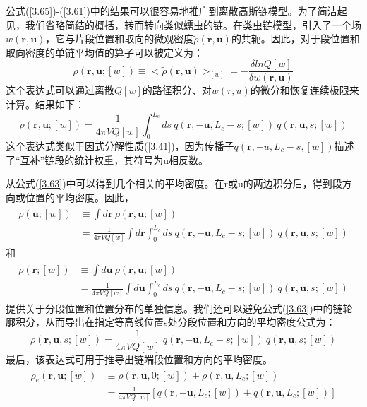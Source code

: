 公式(\ref{3.65})-(\ref{3.61})中的结果可以很容易地推广到离散高斯链模型。为了简洁起见，我们省略简结的概括，转而转向类似蠕虫的链。在类虫链模型，引入了一个场$w(\mathbf{r},\mathbf{u})$，它与片段位置和取向的微观密度$\tilde{\rho}(\mathbf{r},\mathbf{u})$的共轭。因此，对于段位置和取向密度的单链平均值的算子可以被定义为：
\begin{equation}\label{3.62}
\rho(\mathbf{r},\mathbf{u};[w])\equiv <\tilde{\rho}(\mathbf{r},\mathbf{u})>_{[w]}=-\frac{\delta lnQ[w]}{\delta w(\mathbf{r},\mathbf{u})}
\end{equation}
这个表达式可以通过离散$Q[w]$的路径积分、对$w(r,u)$的微分和恢复连续极限来计算。结果如下：
\begin{equation}\label{3.63}
\rho(\mathbf{r},\mathbf{u};[w])=\frac{1}{4\pi VQ[w]}\int_{0}^{L_c}ds~ q(\mathbf{r},-\mathbf{u},L_c-s;[w])~q(\mathbf{r},\mathbf{u},s;[w])
\end{equation}
这个表达式类似于因式分解性质(\ref{3.41})，因为传播子$q(\mathbf{r},-u,L_c-s,[w])$描述了“互补”链段的统计权重，其符号为u相反数。

从公式(\ref{3.63})中可以得到几个相关的平均密度。在r或u的两边积分后，得到段方向或位置的平均密度。因此，
\begin{align}\label{3.64}
\begin{split}
\rho(\mathbf{u};[w])&\equiv\int d\mathbf{r}~\rho(\mathbf{r},\mathbf{u};[w]) \\&=\frac{1}{4\pi VQ[w]}\int d\mathbf{r} \int_{0}^{L_c}ds~q(\mathbf{r},-\mathbf{u},L_c-s;[w])~q(\mathbf{r},\mathbf{u},s;[w])
\end{split}
\end{align}
和
\begin{align}\label{3.65}
\begin{split}
\rho(\mathbf{r};[w])&\equiv\int d\mathbf{u}~\rho(\mathbf{r},\mathbf{u};[w]) \\&=\frac{1}{4\pi VQ[w]}\int d\mathbf{u} \int_{0}^{L_c}ds~q(\mathbf{r},-\mathbf{u},L_c-s;[w])~q(\mathbf{r},\mathbf{u},s;[w])
\end{split}
\end{align}
提供关于分段位置和位置分布的单独信息。我们还可以避免公式(\ref{3.63})中的链轮廓积分，从而导出在指定等高线位置s处分段位置和方向的平均密度公式为：
\begin{equation}\label{3.66}
\rho(\mathbf{r},\mathbf{u},s;[w])=\frac{1}{4\pi VQ[w]}~q(\mathbf{r},-\mathbf{u},L_c-s;[w])~q(\mathbf{r},\mathbf{u},s;[w])
\end{equation}
最后，该表达式可用于推导出链端段位置和方向的平均密度。
\begin{align}\label{3.67}
\begin{split}
\rho_e(\mathbf{r},\mathbf{u};[w])&\equiv\rho(\mathbf{r},\mathbf{u},0;[w])+\rho(\mathbf{r},\mathbf{u},L_c;[w])\\ &=\frac{1}{4\pi VQ[w]}[q(\mathbf{r},-\mathbf{u},L_c;[w])+q(\mathbf{r},\mathbf{u},L_c;[w])]
\end{split}
\end{align}


